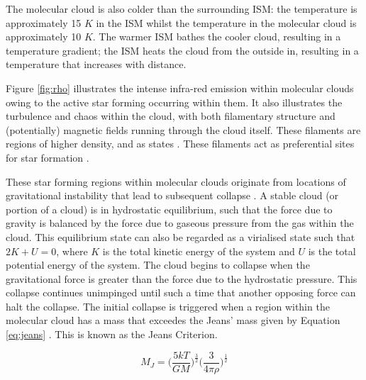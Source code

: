 \documentclass{report}
\begin{document}
The molecular cloud is also colder than the surrounding ISM: the temperature is approximately 15 $K$ in the ISM whilst the temperature in the molecular cloud is approximately 10 $K$. The warmer ISM bathes the cooler cloud, resulting in a temperature gradient; the ISM heats the cloud from the outside in, resulting in a temperature that increases with distance.

Figure \ref{fig:rho} illustrates the intense infra-red emission within molecular clouds owing to the active star forming occurring within them. It also illustrates the turbulence and chaos within the cloud, with both filamentary structure and (potentially) magnetic fields running through the cloud itself. These filaments are regions of higher density, and as \textcite{evo-mol} states . These filaments act as preferential sites for star formation \parencite{filaments}.

These star forming regions within molecular clouds originate from locations of gravitational instability that lead to subsequent collapse \parencite{jeans}. A stable cloud (or portion of a cloud) is in hydrostatic equilibrium, such that the force due to gravity is balanced by the force due to gaseous pressure from the gas within the cloud. This equilibrium state can also be regarded as a virialised state such that $2K+U=0$, where $K$ is the total kinetic energy of the system and $U$ is the total potential energy of the system. The cloud begins to collapse when the gravitational force is greater than the force due to the hydrostatic pressure. This collapse continues unimpinged until such a time that another opposing force can halt the collapse. The initial collapse is triggered when a region within the molecular cloud has a mass that exceedes the Jeans' mass given by Equation \ref{eq:jeans} \parencite{lecture}. This is known as the Jeans Criterion.

\begin{equation}\label{eq:jeans}
  M_{J} = \Bigg( \frac{5kT}{GM} \Bigg )^\frac{3}{2} \Bigg( \frac{3}{4\pi\rho} \Bigg )^\frac{1}{2}
\end{equation}
\end{document}
